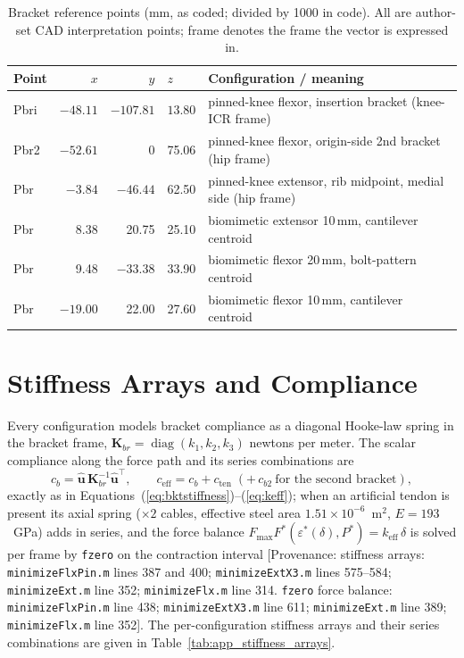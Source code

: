 \begin{table}[htbp]
\caption{Bracket reference points (mm, as coded; divided by 1000 in code). All are author-set CAD interpretation points; frame denotes the frame the vector is expressed in.}
\label{tab:app_bracket_points}
\begin{tabular}{@{}lrrll@{}}
\toprule
\textbf{Point} & $x$ & $y$ & $z$ & \textbf{Configuration / meaning} \\
\midrule
Pbri & $-48.11$ & $-107.81$ & $13.80$ & pinned-knee flexor, insertion bracket (knee-ICR frame) \\
Pbr2 & $-52.61$ & 0 & 75.06 & pinned-knee flexor, origin-side 2nd bracket (hip frame) \\
Pbr  & $-3.84$  & $-46.44$ & 62.50 & pinned-knee extensor, rib midpoint, medial side (hip frame) \\
Pbr  & 8.38 & 20.75 & 25.10 & biomimetic extensor 10\,mm, cantilever centroid \\
Pbr  & 9.48 & $-33.38$ & 33.90 & biomimetic flexor 20\,mm, bolt-pattern centroid \\
Pbr  & $-19.00$ & 22.00 & 27.60 & biomimetic flexor 10\,mm, cantilever centroid \\
\bottomrule
\end{tabular}
\end{table}

\section{Stiffness Arrays and Compliance}

Every configuration models bracket compliance as a diagonal Hooke-law spring in the bracket frame, $\mathbf{K}_{br} = \operatorname{diag}(k_{1}, k_{2}, k_{3})$ newtons per meter. The scalar compliance along the force path and its series combinations are
\begin{equation}
    c_{b} = \hat{\mathbf{u}}\,\mathbf{K}_{br}^{-1}\hat{\mathbf{u}}^{\top},
    \qquad
    c_{\text{eff}} = c_{b} + c_{\text{ten}} \;(+\,c_{b2}\ \text{for the second bracket}),
    \label{eq:app_compliance}
\end{equation}
exactly as in Equations~(\ref{eq:bktstiffness})--(\ref{eq:keff}); when an artificial tendon is present its axial spring ($\times2$ cables, effective steel area $1.51\times10^{-6}$~m$^{2}$, $E = 193$~GPa) adds in series, and the force balance $F_{\max}F^{*}(\varepsilon^{*}(\delta), P^{*}) = k_{\text{eff}}\,\delta$ is solved per frame by \texttt{fzero} on the contraction interval [Provenance: stiffness arrays: \texttt{minimizeFlxPin.m} lines 387 and 400; \texttt{minimizeExtX3.m} lines 575--584; \texttt{minimizeExt.m} line 352; \texttt{minimizeFlx.m} line 314. \texttt{fzero} force balance: \texttt{minimizeFlxPin.m} line 438; \texttt{minimizeExtX3.m} line 611; \texttt{minimizeExt.m} line 389; \texttt{minimizeFlx.m} line 352]. The per-configuration stiffness arrays and their series combinations are given in Table~\ref{tab:app_stiffness_arrays}.

